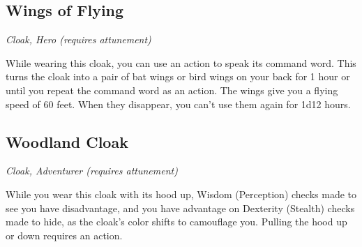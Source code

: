 \subsection{Wings of Flying}
\textit{Cloak, Hero (requires attunement)}

While wearing this cloak, you can use an action to speak its command word. This turns the cloak into a pair of bat wings or bird wings on your back for 1 hour or until you repeat the command word as an action. The wings give you a flying speed of 60 feet. When they disappear, you can't use them again for 1d12 hours.

\subsection{Woodland Cloak}
\textit{Cloak, Adventurer (requires attunement)}

While you wear this cloak with its hood up, Wisdom (Perception) checks made to see you have disadvantage, and you have advantage on Dexterity (Stealth) checks made to hide, as the cloak's color shifts to camouflage you. Pulling the hood up or down requires an action.
